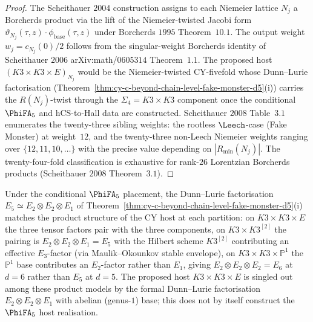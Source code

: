 \begin{proof}
The Scheithauer $2004$ construction assigns to each Niemeier lattice
$N_j$ a Borcherds product via the lift of the Niemeier-twisted
Jacobi form $\vartheta_{N_j}(\tau, z) \cdot \phi_{\mathrm{base}}
(\tau, z)$ under Borcherds $1995$ Theorem~$10.1$. The output weight
$w_j = c_{N_j}(0)/2$ follows from the singular-weight Borcherds
identity of Scheithauer $2006$ arXiv:math/$0605314$ Theorem~$1.1$.
The proposed host $(K3 \times K3 \times E)_{N_j}$ would be the
Niemeier-twisted CY-fivefold whose Dunn--Lurie factorisation
(Theorem~\ref{thm:cy-c-beyond-chain-level-fake-monster-d5}\textup{(i)})
carries the $R(N_j)$-twist through the $\Sigma_4 = K3 \times K3$
component once the conditional $\PhiFA_5$ and hCS-to-Hall data are
constructed. Scheithauer $2008$ Table~$3.1$ enumerates the
twenty-three sibling weights: the rootless $\Leech$-case (Fake
Monster) at weight~$12$, and the twenty-three non-Leech Niemeier
weights ranging over $\{12, 11, 10, \ldots\}$ with the precise
value depending on $|R_{\min}(N_j)|$. The twenty-four-fold
classification is exhaustive for rank-$26$ Lorentzian Borcherds
products (Scheithauer $2008$ Theorem~$3.1$).
\end{proof}

\begin{remark}
\label{rem:cy-c-beyond-dunn-lurie-pairing-diagnostic}
Under the conditional $\PhiFA_5$ placement, the Dunn--Lurie factorisation
$E_5 \simeq E_2 \otimes E_2 \otimes E_1$ of
Theorem~\ref{thm:cy-c-beyond-chain-level-fake-monster-d5}\textup{(i)}
matches the product structure of the CY host at each partition:
on $K3 \times K3 \times E$ the three tensor factors pair with the
three components, on $K3 \times K3^{[2]}$ the pairing is
$E_2 \otimes E_2 \otimes E_1 = E_5$ with the Hilbert scheme
$K3^{[2]}$ contributing an effective $E_3$-factor (via
Maulik--Okounkov stable envelope), on
$K3 \times K3 \times \mathbb P^1$ the $\mathbb P^1$ base contributes
an $E_2$-factor rather than $E_1$, giving
$E_2 \otimes E_2 \otimes E_2 = E_6$ at $d = 6$ rather than $E_5$
at $d = 5$. The proposed host $K3 \times K3 \times E$ is singled out
among these product models by the formal Dunn--Lurie factorisation
$E_2 \otimes E_2 \otimes E_1$ with abelian (genus-$1$) base; this
does not by itself construct the $\PhiFA_5$ host realisation.
\end{remark}

